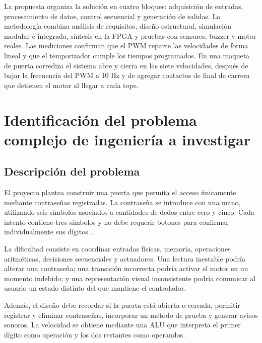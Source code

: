 \documentclass[12pt,letterpaper]{article}
\begin{document}
La propuesta organiza la solución en cuatro bloques:
adquisición de entradas, procesamiento de datos, control
secuencial y generación de salidas. La metodología combina
análisis de requisitos, diseño estructural, simulación
modular e integrada, síntesis en la FPGA y pruebas con
sensores, buzzer y motor reales. Las mediciones confirman
que el PWM reparte las velocidades de forma lineal y que
el temporizador cumple los tiempos programados. En una
maqueta de puerta corrediza el sistema abre y cierra en
las siete velocidades, después de bajar la frecuencia del
PWM a 10 Hz y de agregar contactos de final de carrera
que detienen el motor al llegar a cada tope.

\tableofcontents
\newpage


\section{Identificación del problema complejo de ingeniería
a investigar}

\subsection{Descripción del problema}

El proyecto plantea construir una puerta que permita el
acceso únicamente mediante contraseñas registradas. La
contraseña se introduce con una mano, utilizando seis
símbolos asociados a cantidades de dedos entre cero y cinco.
Cada intento contiene tres símbolos y no debe requerir
botones para confirmar individualmente sus dígitos
\cite{enunciado}.

La dificultad consiste en coordinar entradas físicas,
memoria, operaciones aritméticas, decisiones secuenciales
y actuadores. Una lectura inestable podría alterar una
contraseña; una transición incorrecta podría activar el
motor en un momento indebido; y una representación visual
inconsistente podría comunicar al usuario un estado
distinto del que mantiene el controlador.

Además, el diseño debe recordar si la puerta está abierta
o cerrada, permitir registrar y eliminar contraseñas,
incorporar un método de prueba y generar avisos sonoros.
La velocidad se obtiene mediante una ALU que interpreta
el primer dígito como operación y los dos restantes como
operandos.
\end{document}

